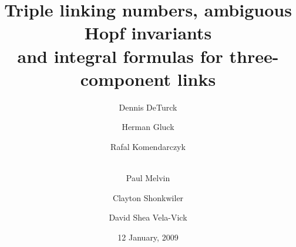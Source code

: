 \documentclass[11pt]{amsart}
\theoremstyle{definition}
\begin{document}




\title{Triple linking numbers, ambiguous Hopf invariants \\ {\footnotesize and} integral formulas {\footnotesize for} three-component links}

\author{Dennis DeTurck \and Herman Gluck \and Rafal Komendarczyk \and \\ Paul Melvin \and Clayton Shonkwiler \and David Shea Vela-Vick}




\date{12 January, 2009}
\end{document}
